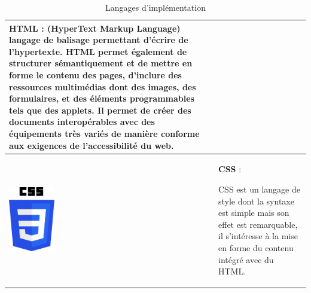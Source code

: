 \documentclass{article}
\begin{document}
\begin{table}[h!]
\begin{tabular}{|m{2cm}|m{12cm}|}
                        HTML : (HyperText Markup Language) langage de balisage permettant d'écrire de l'hypertexte. HTML permet également de structurer sémantiquement et de mettre en forme le contenu des pages, d'inclure des ressources multimédias dont des images, des formulaires, et des éléments programmables tels que des applets. Il permet de créer des documents interopérables avec des équipements très variés de manière conforme aux exigences de l'accessibilité du web. \\
                        \hline
                        \includegraphics[width=2cm]{assets/logos/css.png} &
                        \textbf{CSS} :
                        
                        CSS est un langage de style dont la syntaxe est simple mais son effet est remarquable, il s'intéresse à la mise en forme du contenu intégré avec du HTML. \\
                        \hline
                    \end{tabular}
                    \caption{Langages d'implémentation}
                \end{table}
            \FloatBarrier
\end{document}
